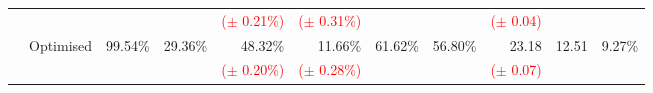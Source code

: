 \begin{tabular}{lrrrrrrrrrr}
                              &                            &                          &                          & \textcolor{red}{($\pm$ 0.21\%)} & \textcolor{red}{($\pm$ 0.31\%)} &                          &                          & \textcolor{red}{($\pm$ 0.04)} &                        &                         \\[2mm]
                              & \multirow{2}{*}{Optimised} & \multirow{2}{*}{99.54\%} & \multirow{2}{*}{29.36\%} & 48.32\%                         & 11.66\%                         & \multirow{2}{*}{61.62\%} & \multirow{2}{*}{56.80\%} & 23.18                         & \multirow{2}{*}{12.51} & \multirow{2}{*}{9.27\%} \\
                              &                            &                          &                          & \textcolor{red}{($\pm$ 0.20\%)} & \textcolor{red}{($\pm$ 0.28\%)} &                          &                          & \textcolor{red}{($\pm$ 0.07)} &                        &                         \\
\bottomrule
\end{tabular}
